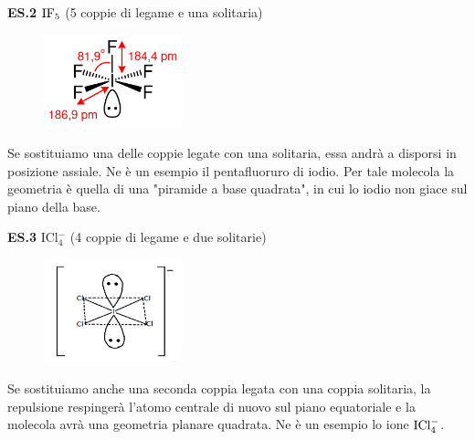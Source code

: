 \vspace{0.2cm}\textbf{ES.2} $\rm IF_5$ (5 coppie di legame e una solitaria)

\hspace{0.5cm}\begin{minipage}{0.2\textwidth}
    \begin{figure}[H]
    \includegraphics[width=4cm]{immagini/IF_5.png}
    \end{figure}
    \end{minipage} \hfill
    \begin{minipage}{0.65\textwidth}
        \vspace{0.2cm}Se sostituiamo una delle coppie legate con una solitaria, essa andrà a disporsi in posizione assiale. Ne è un esempio il pentafluoruro di iodio. Per tale molecola la geometria è quella di una "piramide a base quadrata", in cui lo iodio non giace sul piano della base.
    \end{minipage}

\vspace{0.2cm}\textbf{ES.3} ICl$_4^-$ (4 coppie di legame e due solitarie)

\hspace{0.5cm}\begin{minipage}{0.2\textwidth}
    \begin{figure}[H]
    \includegraphics[width=4cm]{immagini/ICl_4.png}
    \end{figure}
    \end{minipage} \hfill
    \begin{minipage}{0.65\textwidth}
        \vspace{0.2cm}Se sostituiamo anche una seconda coppia legata con una coppia solitaria, la repulsione respingerà l'atomo centrale di nuovo sul piano equatoriale e la molecola avrà una geometria planare quadrata. Ne è un esempio lo ione $\rm ICl_4^-$.
    \end{minipage}

